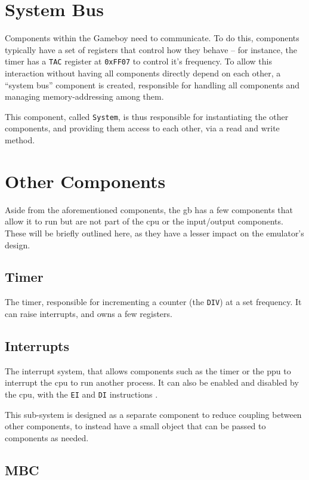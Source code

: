 \documentclass[11pt]{informatics-report}
\begin{document}
\section{System Bus}

Components within the Gameboy need to communicate. To do this, components typically have a set of registers that control how they behave -- for instance, the timer has a \texttt{TAC} register at \texttt{0xFF07} to control it's frequency. To allow this interaction without having all components directly depend on each other, a ``system bus'' component is created, responsible for handling all components and managing memory-addressing among them.

This component, called \texttt{System}, is thus responsible for instantiating the other components, and providing them access to each other, via a read and write method.

\section{Other Components}

Aside from the aforementioned components, the \gls{gb} has a few components that allow it to run but are not part of the \gls{cpu} or the input/output components. These will be briefly outlined here, as they have a lesser impact on the emulator's design.

\subsection{Timer}

The timer, responsible for incrementing a counter (the \texttt{DIV}) at a set frequency. It can raise interrupts, and owns a few registers.

\subsection{Interrupts}

The interrupt system, that allows components such as the timer or the \gls{ppu} to interrupt the \gls{cpu} to run another process. It can also be enabled and disabled by the \gls{cpu}, with the \texttt{EI} and \texttt{DI} instructions \cite[Interrupts]{pandoc}.

This sub-system is designed as a separate component to reduce coupling between other components, to instead have a small object that can be passed to components as needed.

\subsection{MBC}
\end{document}
